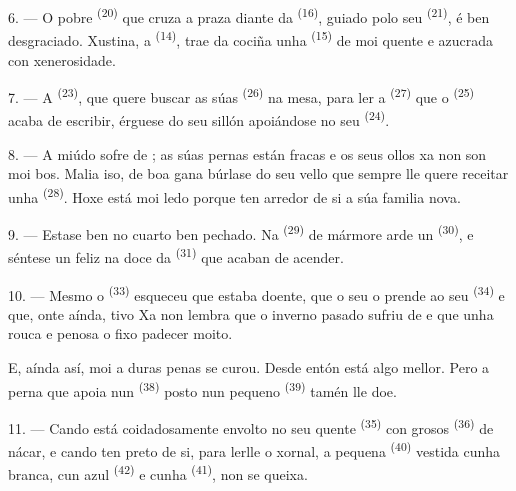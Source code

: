 \VUsaut{4.2mm}
\VUsaut{3.0mm}

6. --- O pobre  \textsuperscript{(20)} que cruza a praza diante da
 \textsuperscript{(16)}, guiado polo seu 
\textsuperscript{(21)}, é ben desgraciado. Xustina, a  \textsuperscript{(14)},
trae da cociña unha  \textsuperscript{(15)} de  moi quente
e azucrada con xenerosidade.

7. --- A  \textsuperscript{(23)}, que quere buscar as súas
 \textsuperscript{(26)} na mesa, para ler a 
\textsuperscript{(27)} que o  \textsuperscript{(25)} acaba de escribir, érguese
do seu sillón apoiándose no seu  \textsuperscript{(24)}.

8. --- A miúdo sofre de ; as súas pernas
están fracas e os seus ollos xa non son moi bos. Malia iso, de boa gana búrlase do seu vello
 que sempre lle quere receitar unha
 \textsuperscript{(28)}. Hoxe está moi ledo porque ten arredor de si a
súa familia nova.

9. --- Estase ben no cuarto ben pechado. Na  \textsuperscript{(29)} de mármore
arde un  \textsuperscript{(30)}, e séntese un feliz na doce
 da  \textsuperscript{(31)} que acaban de acender.

\VUsaut{4.2mm}
\VUsaut{3.0mm}

10. --- Mesmo o  \textsuperscript{(33)} esqueceu que estaba doente, que o seu
 o prende ao seu  \textsuperscript{(34)} e que, onte aínda,
tivo  Xa non lembra que o inverno pasado sufriu de
 e que unha  rouca e penosa o fixo padecer moito.

E, aínda así, moi a duras penas se curou. Desde entón está algo mellor. Pero a perna que apoia
nun  \textsuperscript{(38)} posto nun pequeno
 \textsuperscript{(39)} tamén lle doe.

11. --- Cando está coidadosamente envolto no seu quente  \textsuperscript{(35)}
con grosos  \textsuperscript{(36)} de nácar, e cando ten preto de si, para
lerlle o xornal, a pequena  \textsuperscript{(40)} vestida cunha 
branca, cun  azul \textsuperscript{(42)} e cunha 
\textsuperscript{(41)}, non se queixa.

